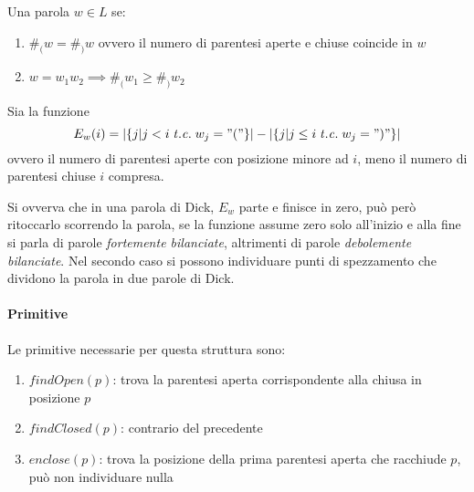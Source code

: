 Una parola $w \in L$ se:
\begin{enumerate}
    \item $\#_( w = \#_) w$ ovvero il numero di parentesi aperte
    e chiuse coincide in $w$
    \item $w = w_1w_2 \implies \#_( w_1 \geq \#_) w_2$
\end{enumerate}

Sia la funzione $$E_w(i) = |\{ j| j < i \mathit{\;t.c.\;} w_j = "(" \}| -
|\{ j| j \leq i \mathit{\;t.c.\;} w_j = ")" \}|$$
ovvero il numero di parentesi aperte con posizione minore ad $i$, meno il numero 
di parentesi chiuse $i$ compresa.

Si ovverva che in una parola di Dick, $E_w$ parte e finisce in zero, 
può però ritoccarlo scorrendo la parola, 
se la funzione assume zero solo all'inizio e alla fine si parla di parole
\emph{fortemente bilanciate}, altrimenti di parole \emph{debolemente bilanciate}.
Nel secondo caso si possono individuare punti di spezzamento che dividono 
la parola in due parole di Dick.

\paragraph{Primitive}
Le primitive necessarie per questa struttura sono:
\begin{enumerate}
    \item $\mathit{findOpen}(p)$: trova la parentesi aperta corrispondente 
    alla chiusa in posizione $p$
    \item $\mathit{findClosed}(p)$: contrario del precedente
    \item $\mathit{enclose}(p)$: trova la posizione della prima parentesi 
    aperta che racchiude $p$, può non individuare nulla
\end{enumerate}

